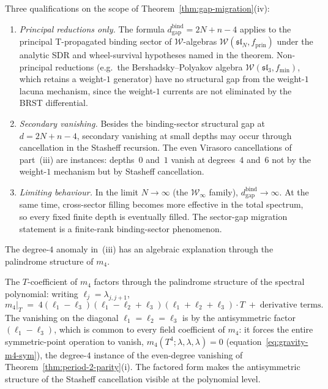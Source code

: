 \begin{remark}%
\label{rem:gap-migration-scope}%
%
Three qualifications on the scope of Theorem~\ref{thm:gap-migration}(iv):
\begin{enumerate}[label=(\alph*)]
\item \emph{Principal reductions only.}
 The formula \(d_{\mathrm{gap}}^{\mathrm{bind}}=2N+n-4\) applies to
 the principal T-propagated binding sector of
 $\mathcal{W}$-algebras $\mathcal{W}(\mathfrak{sl}_N, f_{\mathrm{prin}})$
 under the analytic SDR and wheel-survival hypotheses named in the
 theorem.
 Non-principal reductions (e.g.\ the Bershadsky--Polyakov algebra
 $\mathcal{W}(\mathfrak{sl}_3, f_{\mathrm{min}})$, which retains a
 weight-$1$ generator) have no structural gap from the weight-$1$
 lacuna mechanism, since the weight-$1$ currents are not eliminated
 by the BRST differential.
\item \emph{Secondary vanishing.}
 Besides the binding-sector structural gap at \(d = 2N+n-4\),
 secondary vanishing
 at small depths may occur through cancellation in the Stasheff
 recursion. The even Virasoro cancellations of part~(iii) are
 instances: depths~$0$ and~$1$ vanish at degrees~$4$ and~$6$ not by
 the weight-$1$ mechanism but by Stasheff cancellation.
\item \emph{Limiting behaviour.}
 In the limit $N \to \infty$ (the $\mathcal{W}_\infty$ family),
 \(d_{\mathrm{gap}}^{\mathrm{bind}}\to\infty\).  At the same time,
 cross-sector filling becomes more effective in the total spectrum, so
 every fixed finite depth is eventually filled. The sector-gap
 migration statement is a finite-rank binding-sector phenomenon.
\end{enumerate}
\end{remark}

The degree-$4$ anomaly in~(iii) has an algebraic explanation through
the palindrome structure of $m_4$.

\begin{remark}
\label{rem:m4-palindrome}%
%
The $T$-coefficient of $m_4$ factors through the
palindrome structure of the spectral polynomial: writing
$\ell_j = \lambda_{j,j+1}$,
\begin{equation}\label{eq:m4-full-palindrome}
m_4|_T
\;=\;
4(\ell_1 - \ell_3)(\ell_1 - \ell_2 + \ell_3)
(\ell_1 + \ell_2 + \ell_3) \cdot T
\;+\; \text{derivative terms}.
\end{equation}
The vanishing on the diagonal
$\ell_1 = \ell_2 = \ell_3$
is by the antisymmetric factor $(\ell_1 - \ell_3)$, which is common to
every field coefficient of $m_4$: it forces the entire symmetric-point
operation to vanish, $m_4(T^4;\lambda,\lambda,\lambda) = 0$
(equation~\eqref{eq:gravity-m4-sym}), the degree-$4$ instance of the
even-degree vanishing of Theorem~\ref{thm:period-2-parity}(i). The
factored form makes the antisymmetric structure of the Stasheff
cancellation visible at the polynomial level.
\end{remark}

